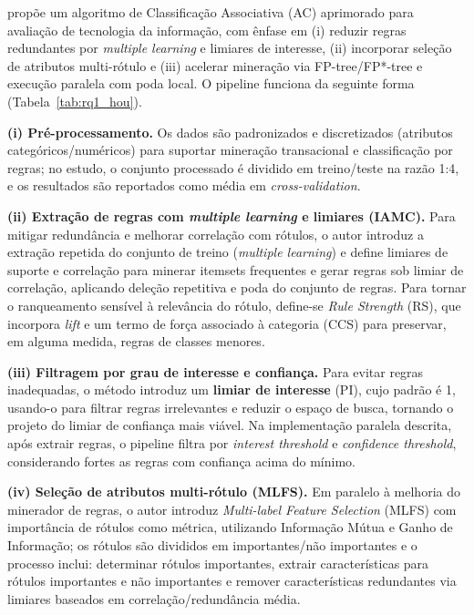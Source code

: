  propõe um algoritmo de Classificação Associativa (AC) aprimorado para avaliação de tecnologia da informação, com ênfase em (i) reduzir regras redundantes por \textit{multiple learning} e limiares de interesse, (ii) incorporar seleção de atributos multi-rótulo e (iii) acelerar mineração via FP-tree/FP*-tree e execução paralela com poda local. O pipeline funciona da seguinte forma (Tabela~\ref{tab:rq1_hou}).

\textbf{(i) Pré-processamento.}
Os dados são padronizados e discretizados (atributos categóricos/numéricos) para suportar mineração transacional e classificação por regras; no estudo, o conjunto processado é dividido em treino/teste na razão 1:4, e os resultados são reportados como média em \textit{cross-validation}. 

\textbf{(ii) Extração de regras com \textit{multiple learning} e limiares (IAMC).}
Para mitigar redundância e melhorar correlação com rótulos, o autor introduz a extração repetida do conjunto de treino (\textit{multiple learning}) e define limiares de suporte e correlação para minerar itemsets frequentes e gerar regras sob limiar de correlação, aplicando deleção repetitiva e poda do conjunto de regras. Para tornar o ranqueamento sensível à relevância do rótulo, define-se \textit{Rule Strength} (RS), que incorpora \textit{lift} e um termo de força associado à categoria (CCS) para preservar, em alguma medida, regras de classes menores.

\textbf{(iii) Filtragem por grau de interesse e confiança.}
Para evitar regras inadequadas, o método introduz um \textbf{limiar de interesse} (PI), cujo padrão é 1, usando-o para filtrar regras irrelevantes e reduzir o espaço de busca, tornando o projeto do limiar de confiança mais viável. Na implementação paralela descrita, após extrair regras, o pipeline filtra por \textit{interest threshold} e \textit{confidence threshold}, considerando fortes as regras com confiança acima do mínimo. 

\textbf{(iv) Seleção de atributos multi-rótulo (MLFS).}
Em paralelo à melhoria do minerador de regras, o autor introduz \textit{Multi-label Feature Selection} (MLFS) com importância de rótulos como métrica, utilizando Informação Mútua e Ganho de Informação; os rótulos são divididos em importantes/não importantes e o processo inclui: determinar rótulos importantes, extrair características para rótulos importantes e não importantes e remover características redundantes via limiares baseados em correlação/redundância média. 

